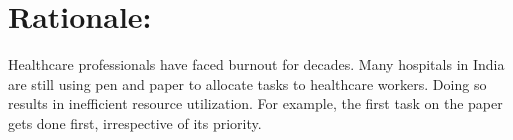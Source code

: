 \section{Rationale:}
Healthcare professionals have faced burnout for decades.
Many hospitals in India are still using pen and paper to allocate tasks 
to healthcare workers.
Doing so results in inefficient resource utilization.
For example, the first task on the paper gets 
done first, irrespective of its priority.
